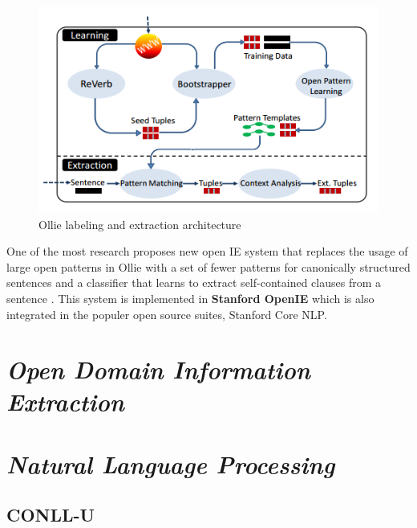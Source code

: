 \begin{figure}
\centering
\includegraphics[scale=0.5]{../images/ollie_architecture.png}
\caption{Ollie labeling and extraction architecture}
\label{fig_ollie_architecture}
\end{figure}

One of the most research proposes new open IE system that replaces the usage of large open patterns in Ollie \citep{schmitz2012open} with a set of fewer patterns for canonically structured sentences and a classifier that learns to extract self-contained clauses from a sentence \citep{angeli2015leveraging}. This system is implemented in \textbf{Stanford OpenIE} which is also integrated in the populer open source suites, Stanford Core NLP.

\section{\textit{Open Domain Information Extraction}}

\lipsum[2-3]

\section{\textit{Natural Language Processing}}

\lipsum[3]

\subsection{CONLL-U}

